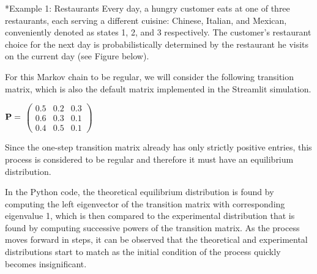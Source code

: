\documentclass[a4paper,12pt]{article}
\theoremstyle{definition}
\let\oldtextbf\mathbf
\renewcommand{\mathbf}[1]{\oldtextbf{\boldmath #1}}
\begin{document}
\begin{tcolorbox}*{Example 1: Restaurants}
	Every day, a hungry customer eats at one of three restaurants, each serving a different cuisine: Chinese, Italian, and Mexican, 		conveniently denoted as states 1, 2, and 3 respectively.
	The customer's restaurant choice for the next day is probabilistically determined by the restaurant he visits on the current day (see Figure below).
\end{tcolorbox}
	\begin{center}
	\end{center}

	For this Markov chain to be regular, we will consider the following transition matrix, which is also the default matrix implemented 
	in the Streamlit simulation.

	\begin{center}	
	$\mathbf{P}=$
           $\begin{pmatrix}
                0.5 & 0.2 & 0.3 \\
                0.6 & 0.3 & 0.1 \\
                0.4 & 0.5 & 0.1
            \end{pmatrix}$
	\end{center}

	Since the one-step transition matrix already has only strictly positive entries, this process is considered to be regular and 
	therefore it must have an equilibrium distribution.

In the Python code, the theoretical equilibrium distribution is found by computing the left eigenvector of the transition matrix with corresponding eigenvalue 1, which is then compared to the experimental distribution that is found by computing successive powers of the transition matrix. As the process moves forward in steps, it can be observed that the theoretical and experimental distributions start to match as the initial condition of the process quickly becomes insignificant.
\end{document}
